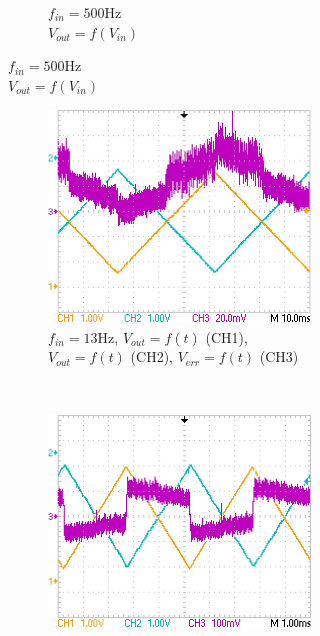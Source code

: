 \documentclass{article}
\begin{document}
\begin{figure}
\begin{subfigure}[b]{0.3\textwidth}
\begin{subfigure}[b]{\textwidth}
			\caption{\centering $f_{in}=\mathrm{500 Hz}$\\$V_{out}=f(V_{in})$}
			\label{fig:ech2}
		\end{subfigure}
	\end{subfigure}
	\hfill
	\begin{subfigure}[b]{0.3\textwidth}
		\begin{subfigure}[b]{\textwidth}
			\centering
			\includegraphics[width=\textwidth]{data/TEK0005_}
			\caption{\centering $f_{in}=\mathrm{13 Hz}$, $V_{out}=f(t)$ (CH1),\\ $V_{out}=f(t)$ (CH2), $V_{err}=f(t)$ (CH3)}
			\label{fig:gain}
		\end{subfigure}
		\\
		\begin{subfigure}[b]{\textwidth}
			\centering
			\includegraphics[width=\textwidth]{data/TEK0010_}

\end{subfigure}
\end{subfigure}
\end{figure}
\end{document}
